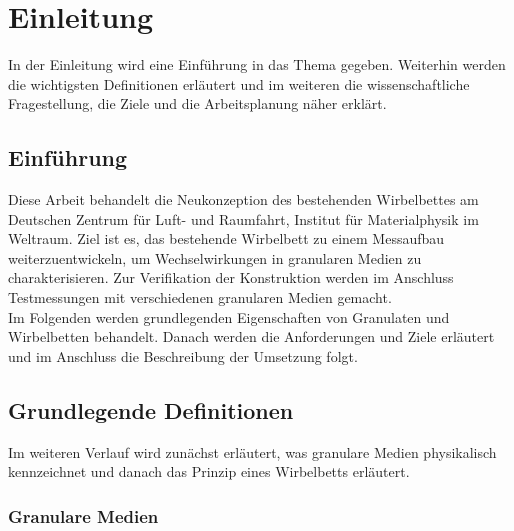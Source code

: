 \chapter{Einleitung}

In der Einleitung wird eine Einführung in das Thema gegeben. Weiterhin werden die wichtigsten Definitionen erläutert und im weiteren die wissenschaftliche Fragestellung, die Ziele und die Arbeitsplanung näher erklärt.

\section{Einführung}

Diese Arbeit behandelt die Neukonzeption des bestehenden Wirbelbettes am Deutschen Zentrum für Luft- und Raumfahrt, Institut für Materialphysik im Weltraum. Ziel ist es, das bestehende Wirbelbett zu einem Messaufbau weiterzuentwickeln, um Wechselwirkungen in granularen Medien zu charakterisieren. Zur Verifikation der Konstruktion werden im Anschluss Testmessungen mit verschiedenen granularen Medien gemacht. \\
Im Folgenden werden grundlegenden Eigenschaften von Granulaten und Wirbelbetten behandelt. Danach werden die Anforderungen und Ziele erläutert und im Anschluss die Beschreibung der Umsetzung folgt.


\section{Grundlegende Definitionen}

Im weiteren Verlauf wird zunächst erläutert, was granulare Medien physikalisch kennzeichnet und danach das Prinzip eines Wirbelbetts erläutert.

\subsection{Granulare Medien}

